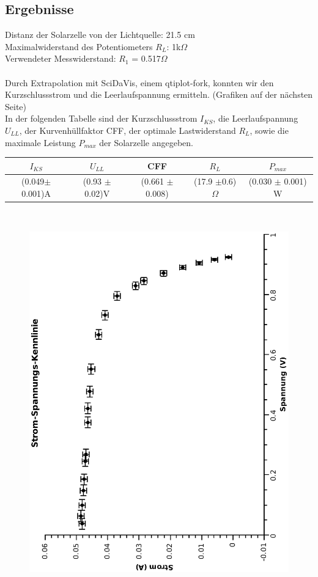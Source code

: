 \documentclass{article}
\begin{document}
\subsection{Ergebnisse}
Distanz der Solarzelle von der Lichtquelle: 21.5 cm\\
Maximalwiderstand des Potentiometers $R_L$: 1k$\Omega$ \\
Verwendeter Messwiderstand: $R_1$ = 0.517$\Omega$\\
\\
Durch Extrapolation mit SciDaVis, einem qtiplot-fork, konnten wir den Kurzschlussstrom und die Leerlaufspannung ermitteln. (Grafiken auf der nächsten Seite)\\
In der folgenden Tabelle sind der Kurzschlussstrom $I_{KS}$, die Leerlaufspannung $U_{LL}$, der Kurvenhüllfaktor CFF, der optimale Lastwiderstand $R_L$, sowie die maximale Leistung $P_{max}$ der Solarzelle angegeben.\\
\begin{center}
\begin{tabular}{|c|c|c|c|c|}
\hline 
$I_{KS}$ & $U_{LL}$ & CFF & $R_L$ & $P_{max}$ \\
\hline \hline
(0.049$\pm $0.001)A & (0.93 $\pm$ 0.02)V & (0.661 $\pm$ 0.008) & (17.9 $\pm $0.6) $\Omega$ &(0.030 $\pm$ 0.001) W \\
\hline
\end{tabular}\\
\end{center}
\begin{center}
\begin{figure}
\includegraphics[scale=0.6,angle=-90]{stromspannungsolar.eps}
\end{figure}
\end{center}
\end{document}
